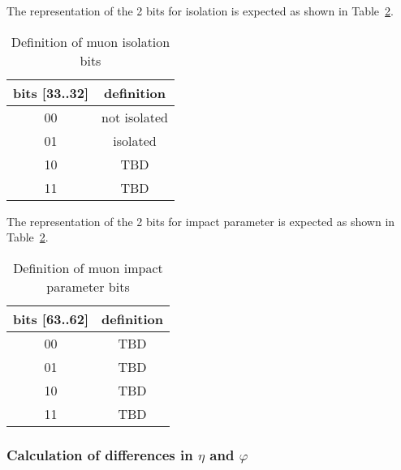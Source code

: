 The representation of the 2 bits for isolation is expected as shown in Table~\ref{tab:gtl:muon_iso_bits}.\\

\begin{table}[ht]
\caption{Definition of muon isolation bits}
\vspace{5mm}
\centering
\begin{tabular}{|c|c|}\hline
bits [33..32] & definition \\\hline\hline
00 & not isolated \\
01 & isolated \\
10 & TBD \\
11 & TBD \\\hline
\end{tabular}
\label{tab:gtl:muon_iso_bits}
\end{table}

The representation of the 2 bits for impact parameter is expected as shown in Table~\ref{tab:gtl:muon_iso_bits}.\\

\begin{table}[ht]
\caption{Definition of muon impact parameter bits}
\vspace{5mm}
\centering
\begin{tabular}{|c|c|}\hline
bits [63..62] & definition \\\hline\hline
00 & TBD \\
01 & TBD \\
10 & TBD \\
11 & TBD \\\hline
\end{tabular}
\label{tab:gtl:muon_iso_bits}
\end{table}

\subsubsection{Calculation of differences in $\eta$ and $\varphi$}
\label{sec:gtl:calculation_differences}

